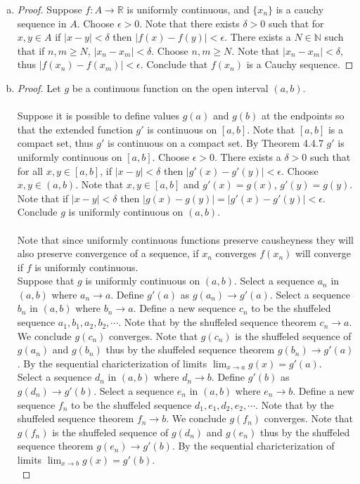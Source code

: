 \documentclass[12pt]{article}
\theoremstyle{homework}
\begin{document}
\begin{enumerate}[(a)]
\item
\begin{proof}
Suppose $f:A\rightarrow \mathbb{R}$ is uniformly continuous, and $\{x_n\}$ is a cauchy sequence in $A$.  Choose $\epsilon>0$.  Note that there exists $\delta>0$ such that for $x,y\in A$ if $|x-y|<\delta$ then $|f(x)-f(y)|<\epsilon$.  There exists a $N\in\mathbb{N}$ such that if $n,m\geq N$, $|x_n-x_m|<\delta$.  Choose $n,m\geq N$.  Note that $|x_n-x_m|<\delta$, thus $|f(x_n)-f(x_m)|<\epsilon$.  Conclude that $f(x_n)$ is a Cauchy sequence.
\end{proof}
\item
\begin{proof}
Let $g$ be a continuous function on the open interval $(a, b)$.\\\\
Suppose it is possible to define values $g(a)$ and $g(b)$ at the endpoints so that the extended function $g'$ is continuous on $[a, b]$.  Note that $[a, b]$ is a compact set, thus $g'$ is continuous on a compact set.  By Theorem 4.4.7 $g'$ is uniformly continuous on $[a,b]$.  Choose $\epsilon>0$.  There exists a $\delta>0$ such that for all $x,y\in [a,b]$, if $|x-y|<\delta$ then $|g'(x)-g'(y)|<\epsilon$.  Choose $x,y\in (a,b)$.  Note that $x,y\in [a,b]$ and $g'(x)=g(x)$, $g'(y)=g(y)$.  Note that if $|x-y|<\delta$ then $|g(x)-g(y)|=|g'(x)-g'(y)|<\epsilon$.  Conclude $g$ is uniformly continuous on $(a,b)$.\\\\
Note that since uniformly continuous functions preserve causheyness they will also preserve convergence of a sequence, if $x_n$ converges $f(x_n)$ will converge if $f$ is uniformly continuous.\\
Suppose that $g$ is uniformly continuous on $(a,b)$.  Select a sequence $a_n$ in $(a,b)$ where $a_n\rightarrow a$.  Define $g'(a)$ as $g(a_n)\rightarrow g'(a)$.  Select a sequence $b_n$ in $(a,b)$ where $b_n\rightarrow a$.  Define a new sequence $c_n$ to be the shuffeled sequence $a_1,b_1,a_2,b_2,\cdots$.  Note that by the shuffeled sequence theorem $c_n\rightarrow a$.  We conclude $g(c_n)$ converges.  Note that $g(c_n)$ is the shuffeled sequence of $g(a_n)$ and $g(b_n)$ thus by the shuffeled sequence theorem $g(b_n)\rightarrow g'(a)$.  By the sequential charicterization of limits $\lim_{x\rightarrow a}g(x)=g'(a)$.\\
Select a sequence $d_n$ in $(a,b)$ where $d_n\rightarrow b$.  Define $g'(b)$ as $g(d_n)\rightarrow g'(b)$.  Select a sequence $e_n$ in $(a,b)$ where $e_n\rightarrow b$.  Define a new sequence $f_n$ to be the shuffeled sequence $d_1,e_1,d_2,e_2,\cdots$.  Note that by the shuffeled sequence theorem $f_n\rightarrow b$.  We conclude $g(f_n)$ converges.  Note that $g(f_n)$ is the shuffeled sequence of $g(d_n)$ and $g(e_n)$ thus by the shuffeled sequence theorem $g(e_n)\rightarrow g'(b)$.  By the sequential charicterization of limits $\lim_{x\rightarrow b}g(x)=g'(b)$.\\

\end{proof}
\end{enumerate}
\end{document}
